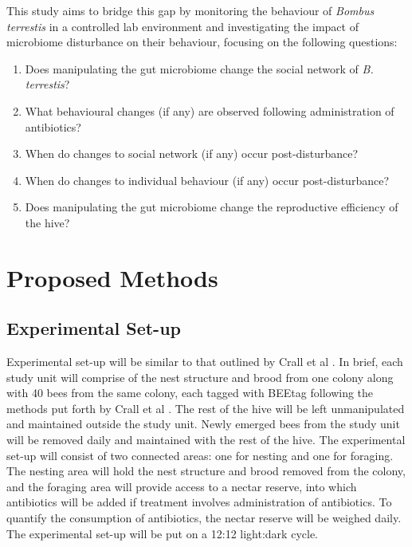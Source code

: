 \documentclass[11pt]{article}
\begin{document}
       This study aims to bridge this gap by monitoring the behaviour of \textit{Bombus terrestis} in a controlled lab environment and investigating the impact of microbiome disturbance on their behaviour,
       focusing on the following questions:
       \begin{enumerate}
            \item Does manipulating the gut microbiome change the social network of \textit{B. terrestis}?
            \item What behavioural changes (if any) are observed following administration of antibiotics?
            \item When do changes to social network (if any) occur post-disturbance?
            \item When do changes to individual behaviour (if any) occur post-disturbance?
            \item Does manipulating the gut microbiome change the reproductive efficiency of the hive?
       \end{enumerate}
 
    \section{Proposed Methods}
        \subsection{Experimental Set-up}
            Experimental set-up will be similar to that outlined by Crall et al
            \cite{crall2018neonicotinoid}.
            In brief,
            each study unit will comprise of the nest structure and brood from one colony along with 40 bees from the same colony,
            each tagged with BEEtag following the methods put forth by Crall et al
            \cite{crall2015beetag}.
            The rest of the hive will be left unmanipulated and maintained outside the study unit.
            Newly emerged bees from the study unit will be removed daily and maintained with the rest of the hive.
            The experimental set-up will consist of two connected areas:
            one for nesting and one for foraging.
            The nesting area will hold the nest structure and brood removed from the colony,
            and the foraging area will provide access to a nectar reserve,
            into which antibiotics will be added if treatment involves administration of antibiotics.
            To quantify the consumption of antibiotics,
            the nectar reserve will be weighed daily.
            The experimental set-up will be put on a 12:12 light:dark cycle.
 
\end{document}
